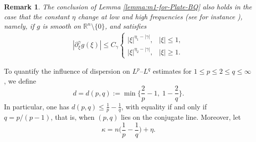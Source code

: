\documentclass[10pt]{article}
\newtheorem{remark}{Remark}[section]
\newcommand{\<}{\langle}
\renewcommand{\>}{\rangle}
\numberwithin{equation}{section}
\begin{document}
\begin{remark}
The conclusion of Lemma \ref{lemma:m1-for-Plate-BQ} also holds in the case that the constant $\eta$ change at low and high frequencies (see  for instance \cite{M80}), namely, if $g$ is smooth on $\mathbb R^n\setminus\{0\}$, and satisfies
\begin{align*}
|\partial_\xi^\gamma g(\xi)|\le C_\gamma
\begin{cases}
|\xi|^{\eta_1-|\gamma|}, & |\xi|\leq 1,\\
|\xi|^{\eta_2-|\gamma|}, & |\xi|\geq 1.
\end{cases}
\end{align*}
\end{remark}


To quantify the influence of dispersion on $L^p$–$L^q$ estimates for $1\leq p\leq 2\leq q\leq \infty$, we define
\begin{equation}\label{eq:dH}
d=d(p,q):=\min\Big\{ \frac{2}{p}-1,\;1-\frac{2}{q} \Big\}.
\end{equation}
In particular, one has $d(p,q)\leq \frac{1}{p}-\frac{1}{q}$, with equality if and only if $q=p/(p-1)$, that is, when $(p,q)$ lies on the conjugate line. Moreover, let
\begin{equation}\label{eq:kappaH}
\kappa=n\Big(\frac1p-\frac1q\Big)+\eta.
\end{equation}
\end{document}
